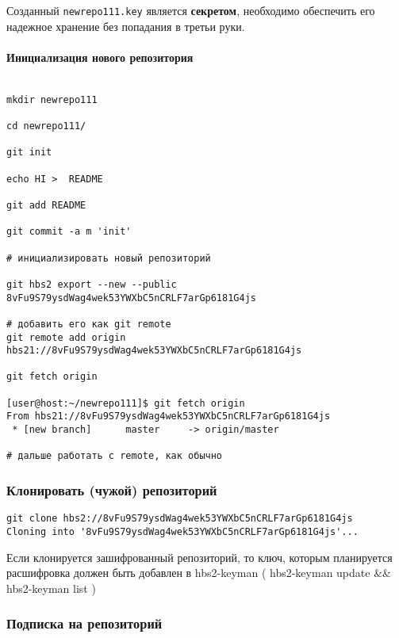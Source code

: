 \documentclass[11pt,a4paper]{article}
\begin{document}
Созданный \texttt{newrepo111.key} является \textbf{секретом}, необходимо обеспечить его надежное
хранение без попадания в третьи руки.

\paragraph{Инициализация нового репозитория}

\begin{verbatim}

mkdir newrepo111

cd newrepo111/

git init

echo HI >  README

git add README

git commit -a m 'init'

# инициализировать новый репозиторий

git hbs2 export --new --public 8vFu9S79ysdWag4wek53YWXbC5nCRLF7arGp6181G4js

# добавить его как git remote
git remote add origin hbs21://8vFu9S79ysdWag4wek53YWXbC5nCRLF7arGp6181G4js

git fetch origin

[user@host:~/newrepo111]$ git fetch origin
From hbs21://8vFu9S79ysdWag4wek53YWXbC5nCRLF7arGp6181G4js
 * [new branch]      master     -> origin/master

# дальше работать с remote, как обычно

\end{verbatim}

\subsubsection{Клонировать (чужой) репозиторий}

\begin{verbatim}
git clone hbs2://8vFu9S79ysdWag4wek53YWXbC5nCRLF7arGp6181G4js
Cloning into '8vFu9S79ysdWag4wek53YWXbC5nCRLF7arGp6181G4js'...

\end{verbatim}

Если клонируется зашифрованный репозиторий, то ключ, которым планируется
расшифровка должен быть добавлен в hbs2-keyman ( hbs2-keyman update \&\& hbs2-keyman list )

\subsubsection{Подписка на репозиторий}
\end{document}
